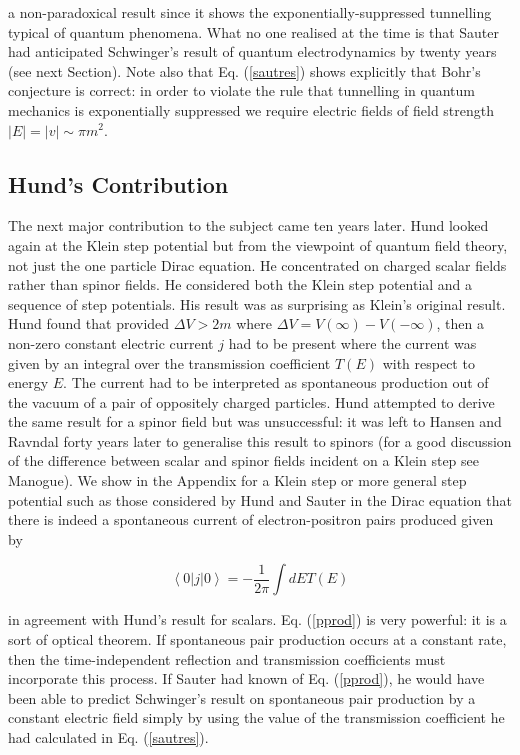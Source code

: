 \noindent a non-paradoxical result since it shows the
exponentially-suppressed tunnelling typical of quantum phenomena. What no
one realised at the time is that Sauter had anticipated Schwinger's\cite
{schwing} result of quantum electrodynamics by twenty years (see next
Section). Note also that Eq. (\ref{sautres}) shows explicitly that Bohr's
conjecture is correct: in order to violate the rule that tunnelling in
quantum mechanics is exponentially suppressed we require electric fields of
field strength $\left| E\right| =\left| v\right| \sim \pi m^2$.

\subsection{Hund's Contribution}

\noindent The next major contribution to the subject came ten years later.
Hund \cite{hund} looked again at the Klein step potential but from the
viewpoint of quantum field theory, not just the one particle Dirac equation.
He concentrated on charged scalar fields rather than spinor fields. He
considered both the Klein step potential and a sequence of step potentials.
His result was as surprising as Klein's original result. Hund found that
provided $\Delta V>2m$ where $\Delta V=V(\infty )-V(-\infty )$, then a
non-zero constant electric current $j$ had to be present where the current
was given by an integral over the transmission coefficient $T(E)$ with
respect to energy $E$. The current had to be interpreted as spontaneous
production out of the vacuum of a pair of oppositely charged particles. Hund
attempted to derive the same result for a spinor field but was unsuccessful:
it was left to Hansen and Ravndal \cite{hans} forty years later to
generalise this result to spinors (for a good discussion of the difference
between scalar and spinor fields incident on a Klein step see Manogue\cite
{mano}). We show in the Appendix for a Klein step or more general step
potential such as those considered by Hund and Sauter in the Dirac equation
that there is indeed a spontaneous current of electron-positron pairs
produced given by

\begin{equation}
\left\langle 0\right| j\left| 0\right\rangle =-\frac 1{2\pi }\int dET(E)
\label{pprod}
\end{equation}

\noindent in agreement with Hund's result for scalars. Eq. (\ref{pprod}) is
very powerful: it is a sort of optical theorem. If spontaneous pair
production occurs at a constant rate, then the time-independent reflection
and transmission coefficients must incorporate this process. If Sauter had
known of Eq. (\ref{pprod}), he would have been able to predict Schwinger's 
\cite{schwing} result on spontaneous pair production by a constant electric
field simply by using the value of the transmission coefficient he had
calculated in Eq. (\ref{sautres}).

